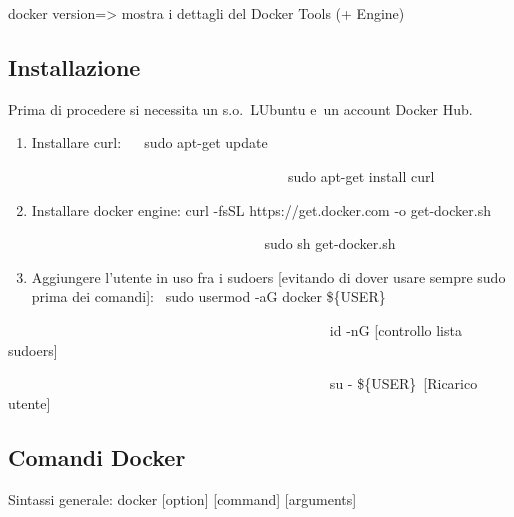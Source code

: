 \documentclass[
]{article}
\providecommand{\tightlist}{%
  \setlength{\itemsep}{0pt}\setlength{\parskip}{0pt}}
\begin{document}
{}

{docker version=\textgreater{} mostra i dettagli del Docker Tools (+
Engine)}

{}

\subsection{\texorpdfstring{{Installazione}}{Installazione}}\label{h.awewb2eontor}

{Prima di procedere si necessita un }{s.o.}{~}{LUbuntu e}{~un account
Docker Hub.}

\begin{enumerate}
\tightlist
\item
  {Installare curl: ~ ~}{sudo apt-get update}
\end{enumerate}

{~ ~ ~ ~ ~ ~ ~ ~ ~ ~ ~ ~ ~ ~ ~ ~ ~ ~ ~ ~ ~ ~ ~ ~ sudo apt-get install
curl}

{}

\begin{enumerate}
\setcounter{enumi}{1}
\tightlist
\item
  {Installare docker engine: }{curl -fsSL https://get.docker.com -o
  get-docker.sh}
\end{enumerate}

{~ ~ ~ ~ ~ ~ ~ ~ ~ ~ ~ ~ ~ ~ ~ ~ ~ ~ ~ ~ ~ ~ sudo sh get-docker.sh}

{}

\begin{enumerate}
\setcounter{enumi}{2}
\tightlist
\item
  {Aggiungere l'utente in uso fra i sudoers {[}evitando di dover usare
  sempre sudo prima dei comandi{]}: }{~sudo usermod -aG docker
  \$\{USER\}}
\end{enumerate}

{~ ~ ~ ~ ~ ~ ~ ~ ~ ~ ~ ~ ~ ~ ~ ~ ~ ~ ~ ~ ~ ~ ~ ~ ~ ~ ~ ~id -nG
}{{[}controllo lista sudoers{]}}

{~ ~ ~ ~ ~ ~ ~ ~ ~ ~ ~ ~ ~ ~ ~ ~ ~ ~ ~ ~ ~ ~ ~ ~ ~ ~ ~ ~su -
\$\{USER\}}{~{[}Ricarico utente{]}}

{}

\subsection{\texorpdfstring{{Comandi
Docker}}{Comandi Docker}}\label{h.z0urwcbr7pqf}

{Sintassi generale: }{docker {[}option{]} {[}command{]} {[}arguments{]}}
\end{document}
